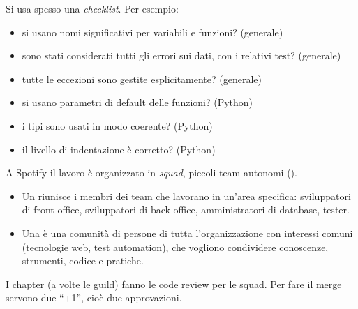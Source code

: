 Si usa spesso una \emph{checklist}. Per esempio:
\begin{itemize}
  \item si usano nomi significativi per variabili e funzioni? (generale)
  \item sono stati considerati tutti gli errori sui dati, con i relativi test? (generale)
  \item tutte le eccezioni sono gestite esplicitamente? (generale)
  \item si usano parametri di default delle funzioni? (Python)
  \item i tipi sono usati in modo coerente? (Python)
  \item il livello di indentazione è corretto? (Python)
\end{itemize}

\begin{esempio}
\label{es:test-spotify}
A Spotify il lavoro è organizzato in \emph{squad}, piccoli team autonomi ().
\begin{itemize}
  \item Un  riunisce i membri dei team che lavorano in un'area specifica: sviluppatori di front office,
    sviluppatori di back office, amministratori di database, tester.
  \item Una  è una comunità di persone di tutta l'organizzazione con interessi comuni (tecnologie web,
    test automation), che vogliono condividere conoscenze, strumenti, codice e pratiche.
\end{itemize}
I chapter (a volte le guild) fanno le code review per le squad. Per fare il merge servono due ``+1'', cioè due
approvazioni.
\end{esempio}

